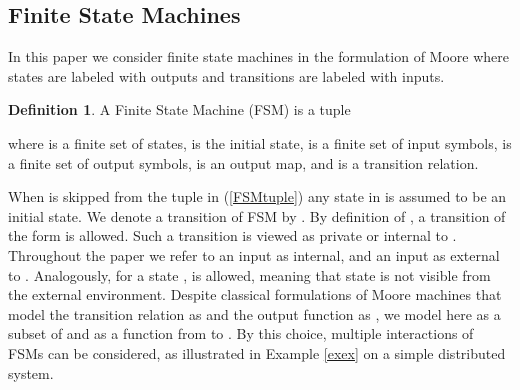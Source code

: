 \documentclass{amsart}
\theoremstyle{definition}
\newtheorem{definition}[theorem]{Definition}
\theoremstyle{remark}
\numberwithin{equation}{section}
\begin{document}
\subsection{Finite State Machines}
In this paper we consider finite state machines in the formulation of Moore \cite{Moore} where states are labeled with outputs and transitions are labeled with inputs.
\begin{definition} 
\cite{FSMmin} 
\label{DefFSM}
A Finite State Machine (FSM) is a tuple 

where  is a finite set of states,  is the initial state,  is a finite set of input symbols,  is a finite set of output symbols,   is an output map, and  is a transition relation. 
\end{definition}
When  is skipped from the tuple in (\ref{FSMtuple}) any state in  is assumed to be an initial state. 
We denote a transition  of FSM  by .  
By definition of , a transition of the form  is allowed. Such a transition is viewed as private or internal to . Throughout the paper we refer to an input  as internal, and an input  as external to . 
Analogously, for a state ,  is allowed, meaning that state  is not visible from the external environment. 
Despite classical formulations of Moore machines that model the transition relation as  and the output function as , we model here  as a subset of  and  as a function from  to . By this choice, multiple interactions of FSMs can be considered, as illustrated in Example \ref{exex} on a simple distributed system. 
\end{document}
